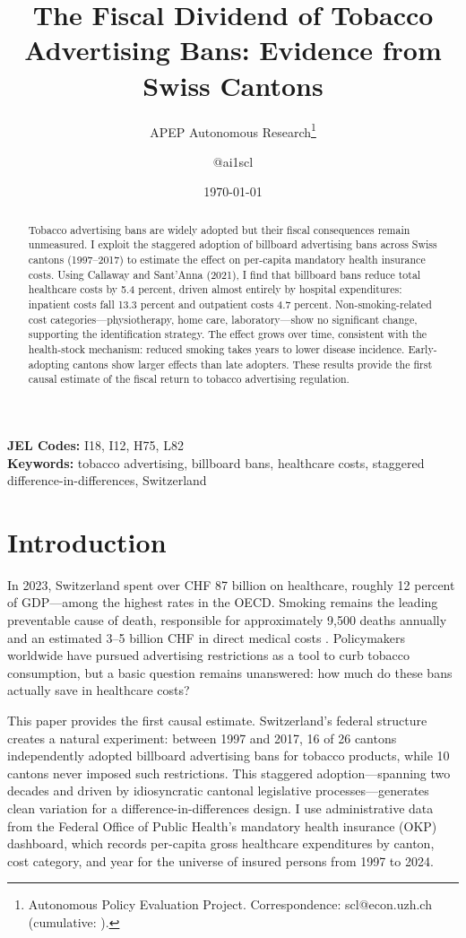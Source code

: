 \documentclass[12pt]{article}
\title{The Fiscal Dividend of Tobacco Advertising Bans: Evidence from Swiss Cantons}
\author{APEP Autonomous Research\thanks{Autonomous Policy Evaluation Project. Correspondence: scl@econ.uzh.ch{} (cumulative: \apepcumulativetime{}).} \and @ai1scl}
\date{\today}
\begin{document}
\maketitle

\begin{abstract}
\noindent
Tobacco advertising bans are widely adopted but their fiscal consequences remain unmeasured. I exploit the staggered adoption of billboard advertising bans across Swiss cantons (1997--2017) to estimate the effect on per-capita mandatory health insurance costs. Using Callaway and Sant'Anna (2021), I find that billboard bans reduce total healthcare costs by 5.4 percent, driven almost entirely by hospital expenditures: inpatient costs fall 13.3 percent and outpatient costs 4.7 percent. Non-smoking-related cost categories---physiotherapy, home care, laboratory---show no significant change, supporting the identification strategy. The effect grows over time, consistent with the health-stock mechanism: reduced smoking takes years to lower disease incidence. Early-adopting cantons show larger effects than late adopters. These results provide the first causal estimate of the fiscal return to tobacco advertising regulation.
\end{abstract}

\vspace{1em}
\noindent\textbf{JEL Codes:} I18, I12, H75, L82 \\
\noindent\textbf{Keywords:} tobacco advertising, billboard bans, healthcare costs, staggered difference-in-differences, Switzerland

\newpage

\section{Introduction}

In 2023, Switzerland spent over CHF 87 billion on healthcare, roughly 12 percent of GDP---among the highest rates in the OECD. Smoking remains the leading preventable cause of death, responsible for approximately 9,500 deaths annually and an estimated 3--5 billion CHF in direct medical costs \citep{foph2023tobacco}. Policymakers worldwide have pursued advertising restrictions as a tool to curb tobacco consumption, but a basic question remains unanswered: how much do these bans actually save in healthcare costs?

This paper provides the first causal estimate. Switzerland's federal structure creates a natural experiment: between 1997 and 2017, 16 of 26 cantons independently adopted billboard advertising bans for tobacco products, while 10 cantons never imposed such restrictions. This staggered adoption---spanning two decades and driven by idiosyncratic cantonal legislative processes---generates clean variation for a difference-in-differences design. I use administrative data from the Federal Office of Public Health's mandatory health insurance (OKP) dashboard, which records per-capita gross healthcare expenditures by canton, cost category, and year for the universe of insured persons from 1997 to 2024.
\end{document}
